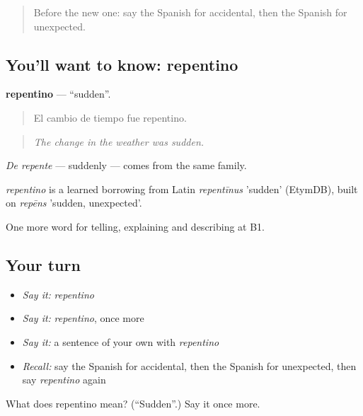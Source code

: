 \begin{quote}
Before the new one: say the Spanish for accidental, then the Spanish for unexpected.
\end{quote}

\subsection*{You'll want to know: repentino}
\textbf{repentino} — \textquotedblleft{}sudden\textquotedblright{}.

\begin{quote}
El cambio de tiempo fue repentino.
\end{quote}

\begin{quote}
\emph{The change in the weather was sudden.}
\end{quote}

\emph{De repente} — suddenly — comes from the same family.

\begin{cousinweb}
\emph{repentino} is a learned borrowing from Latin \emph{repentīnus} 'sudden' (EtymDB), built on \emph{repēns} 'sudden, unexpected'.
\end{cousinweb}

\begin{grammarlens}[title={What you've built}]
One more word for telling, explaining and describing at B1.
\end{grammarlens}

\subsection*{Your turn}
\begin{itemize}
\raggedright
  \item \emph{Say it:} \emph{repentino}
  \item \emph{Say it:} \emph{repentino}, once more
  \item \emph{Say it:} a sentence of your own with \emph{repentino}
  \item \emph{Recall:} say the Spanish for accidental, then the Spanish for unexpected, then say \emph{repentino} again
\end{itemize}

\begin{tcolorbox}[breakable,colback=teal!4,colframe=teal!35!black,title={Before you move on}]
What does repentino mean? (\textquotedblleft{}Sudden\textquotedblright{}.) Say it once more.
\end{tcolorbox}
